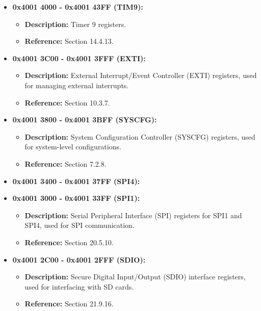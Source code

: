 \documentclass{article}
\begin{document}
\begin{itemize}
\begin{itemize}
        \item \textbf{0x4001 4000 - 0x4001 43FF (TIM9):} 
        \begin{itemize}
            \item \textbf{Description:} Timer 9 registers.
            \item \textbf{Reference:} Section 14.4.13.
        \end{itemize}
        
        \item \textbf{0x4001 3C00 - 0x4001 3FFF (EXTI):} 
        \begin{itemize}
            \item \textbf{Description:} External Interrupt/Event Controller (EXTI) registers, used for managing external interrupts.
            \item \textbf{Reference:} Section 10.3.7.
        \end{itemize}
        
        \item \textbf{0x4001 3800 - 0x4001 3BFF (SYSCFG):} 
        \begin{itemize}
            \item \textbf{Description:} System Configuration Controller (SYSCFG) registers, used for system-level configurations.
            \item \textbf{Reference:} Section 7.2.8.
        \end{itemize}
        
        \item \textbf{0x4001 3400 - 0x4001 37FF (SPI4):}
        \item \textbf{0x4001 3000 - 0x4001 33FF (SPI1):} 
        \begin{itemize}
            \item \textbf{Description:} Serial Peripheral Interface (SPI) registers for SPI1 and SPI4, used for SPI communication.
            \item \textbf{Reference:} Section 20.5.10.
        \end{itemize}
        
        \item \textbf{0x4001 2C00 - 0x4001 2FFF (SDIO):} 
        \begin{itemize}
            \item \textbf{Description:} Secure Digital Input/Output (SDIO) interface registers, used for interfacing with SD cards.
            \item \textbf{Reference:} Section 21.9.16.
        \end{itemize}
        

\end{itemize}
\end{itemize}
\end{document}
